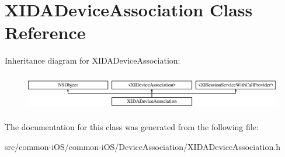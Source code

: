 \hypertarget{interface_x_i_d_a_device_association}{}\section{X\+I\+D\+A\+Device\+Association Class Reference}
\label{interface_x_i_d_a_device_association}
Inheritance diagram for X\+I\+D\+A\+Device\+Association\+:\begin{figure}[H]
\begin{center}
\leavevmode
\includegraphics[height=1.630277cm]{interface_x_i_d_a_device_association}
\end{center}
\end{figure}


The documentation for this class was generated from the following file\+:\begin{DoxyCompactItemize}
\item 
src/common-\/i\+O\+S/common-\/i\+O\+S/\+Device\+Association/X\+I\+D\+A\+Device\+Association.\+h\end{DoxyCompactItemize}
